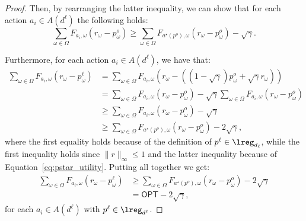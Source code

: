 \begin{proof}
	 Then, by rearranging the latter inequality, we can show that for each action $a_i \in A(d^\ell)$ the following holds: \begin{equation}\label{eq:pstar_utility}
	\sum_{\omega \in \Omega }  F_{a_i,\omega} ( r_\omega - p^o_\omega ) \ge \sum_{\omega \in \Omega } F_{a^\star(p^o),\omega} ( r_\omega - p^o_\omega ) - \sqrt{\gamma}.
	\end{equation}
	
	Furthermore, for each action $a_i \in A(d^\ell)$, we have that:
	\begin{align*}
		\sum_{\omega \in \Omega} F_{a_i, \omega} \left( r_\omega - p^\ell_\omega \right)
		& =  \sum_{\omega \in \Omega} F_{a_i, \omega} \left( r_\omega - \left((1-\sqrt{\gamma}) p_\omega^o + \sqrt{\gamma} r_\omega \right) \right) \\
		& =  \sum_{\omega \in \Omega} F_{a_i, \omega} \left( r_\omega - p^o_\omega \right)  -\sqrt{ \gamma} \sum_{\omega \in \Omega} F_{a_i, \omega} \left( r_\omega - p^o_\omega \right)\\
		& \ge  \sum_{\omega \in \Omega} F_{a_i, \omega} \left( r_\omega - p^o_\omega \right)  -\sqrt{ \gamma}  \\
		& \ge \sum_{\omega \in \Omega } F_{a^\star(p^o),\omega} ( r_\omega - p^o_\omega )  - 2 \sqrt{\gamma},
	\end{align*}
	where the first equality holds because of the definition of $p^\ell \in \lreg_{d_\ell}$, while the first inequality holds since $\| r \|_\infty \le 1$ and the latter inequality because of Equation~\eqref{eq:pstar_utility}. Putting all together we get:
	\begin{align}\label{eq:epsilon_opt}
		\sum_{\omega \in \Omega} F_{a_i, \omega} \left( r_\omega - p^\ell_\omega \right) & \ge \sum_{\omega \in \Omega } F_{a^\star(p^o),\omega} ( r_\omega - p^o_\omega ) - 2 \sqrt{\gamma} \nonumber \\ & = \mathsf{OPT} - 2 \sqrt{\gamma},
	\end{align}
	for each $a_i \in A(d^\ell)$ with $p^\ell \in \lreg_{d^\ell}$. 


\end{proof}
